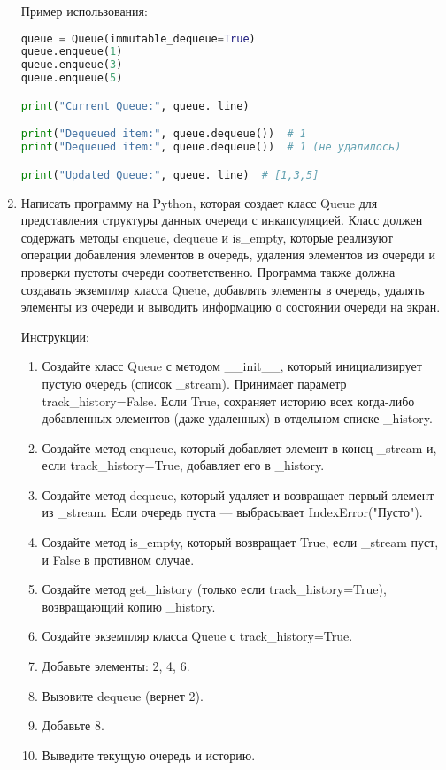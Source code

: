 \begin{enumerate}
Пример использования:
\begin{lstlisting}[language=Python]
queue = Queue(immutable_dequeue=True)
queue.enqueue(1)
queue.enqueue(3)
queue.enqueue(5)

print("Current Queue:", queue._line)

print("Dequeued item:", queue.dequeue())  # 1
print("Dequeued item:", queue.dequeue())  # 1 (не удалилось)

print("Updated Queue:", queue._line)  # [1,3,5]
\end{lstlisting}

\item Написать программу на Python, которая создает класс Queue для представления структуры данных очереди с инкапсуляцией. Класс должен содержать методы enqueue, dequeue и is\_empty, которые реализуют операции добавления элементов в очередь, удаления элементов из очереди и проверки пустоты очереди соответственно. Программа также должна создавать экземпляр класса Queue, добавлять элементы в очередь, удалять элементы из очереди и выводить информацию о состоянии очереди на экран.

Инструкции:
\begin{enumerate}
    \item Создайте класс Queue с методом \_\_init\_\_, который инициализирует пустую очередь (список \_stream). Принимает параметр track\_history=False. Если True, сохраняет историю всех когда-либо добавленных элементов (даже удаленных) в отдельном списке \_history.
    \item Создайте метод enqueue, который добавляет элемент в конец \_stream и, если track\_history=True, добавляет его в \_history.
    \item Создайте метод dequeue, который удаляет и возвращает первый элемент из \_stream. Если очередь пуста — выбрасывает IndexError("Пусто").
    \item Создайте метод is\_empty, который возвращает True, если \_stream пуст, и False в противном случае.
    \item Создайте метод get\_history (только если track\_history=True), возвращающий копию \_history.
    \item Создайте экземпляр класса Queue с track\_history=True.
    \item Добавьте элементы: 2, 4, 6.
    \item Вызовите dequeue (вернет 2).
    \item Добавьте 8.
    \item Выведите текущую очередь и историю.
\end{enumerate}


\end{enumerate}
